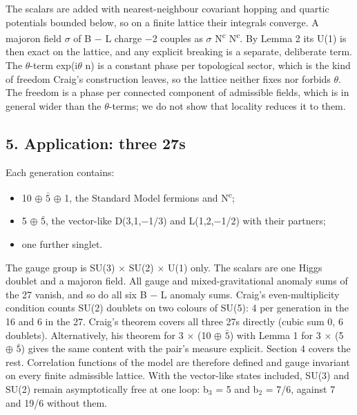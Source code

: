 \documentclass[
  11pt,
]{article}
\providecommand{\tightlist}{%
  \setlength{\itemsep}{0pt}\setlength{\parskip}{0pt}}
\begin{document}
The scalars are added with nearest-neighbour covariant hopping and quartic potentials bounded below, so on a finite lattice their integrals converge. A majoron field \ensuremath{\sigma} of B \ensuremath{-} L charge \ensuremath{-}2 couples as \ensuremath{\sigma} N\textsuperscript{c} N\textsuperscript{c}. By Lemma 2 its U(1) is then exact on the lattice, and any explicit breaking is a separate, deliberate term. The \ensuremath{\theta}-term exp(i\ensuremath{\theta} n) is a constant phase per topological sector, which is the kind of freedom Craig's construction leaves, so the lattice neither fixes nor forbids \ensuremath{\theta}. The freedom is a phase per connected component of admissible fields, which is in general wider than the \ensuremath{\theta}-terms; we do not show that locality reduces it to them.

\hypertarget{application-three-27s}{%
\subsection{5. Application: three 27s}\label{application-three-27s}}

Each generation contains:

\begin{itemize}
\tightlist
\item
  10 \ensuremath{\oplus} \ensuremath{\bar{5}} \ensuremath{\oplus} 1, the Standard Model fermions and N\textsuperscript{c};
\item
  5 \ensuremath{\oplus} \ensuremath{\bar{5}}, the vector-like D(3,1,\ensuremath{-}1/3) and L(1,2,\ensuremath{-}1/2) with their partners;
\item
  one further singlet.
\end{itemize}

The gauge group is SU(3) \ensuremath{\times} SU(2) \ensuremath{\times} U(1) only. The scalars are one Higgs doublet and a majoron field. All gauge and mixed-gravitational anomaly sums of the 27 vanish, and so do all six B \ensuremath{-} L anomaly sums. Craig's even-multiplicity condition counts SU(2) doublets on two colours of SU(5): 4 per generation in the 16 and 6 in the 27. Craig's theorem covers all three 27s directly (cubic sum 0, 6 doublets). Alternatively, his theorem for 3 \ensuremath{\times} (10 \ensuremath{\oplus} \ensuremath{\bar{5}}) with Lemma 1 for 3 \ensuremath{\times} (5 \ensuremath{\oplus} \ensuremath{\bar{5}}) gives the same content with the pair's measure explicit. Section 4 covers the rest. Correlation functions of the model are therefore defined and gauge invariant on every finite admissible lattice. With the vector-like states included, SU(3) and SU(2) remain asymptotically free at one loop: b\ensuremath{_{3}} = 5 and b\ensuremath{_{2}} = 7/6, against 7 and 19/6 without them.
\end{document}
